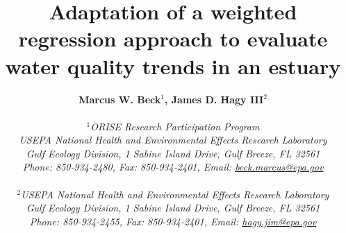 \documentclass[letterpaper,12pt,oneside]{article}\usepackage{graphicx, color}
\begin{document}
\raggedbottom
\linenumbers
\raggedright
{}
\setlength{\parindent}{0.5in}
\renewcommand\refname{References \vspace{12pt}}

\begin{singlespace}
\title{{\bf {\Large Adaptation of a weighted regression approach to evaluate water quality trends in an estuary}}}
\author{
  {\bf {\normalsize Marcus W. Beck$^1$, James D. Hagy III$^2$}}
	\\\\{\textit {\normalsize $^1$ORISE Research Participation Program}}
  \\{\textit {\normalsize USEPA National Health and Environmental Effects Research Laboratory}}
	\\{\textit {\normalsize Gulf Ecology Division, 1 Sabine Island Drive, Gulf Breeze, FL 32561}}
	\\{\textit {\normalsize Phone: 850-934-2480, Fax: 850-934-2401, Email: \href{mailto:beck.marcus@epa.gov}{beck.marcus@epa.gov}}}
	\\\\{\textit {\normalsize $^2$USEPA National Health and Environmental Effects Research Laboratory}}
	\\{\textit {\normalsize Gulf Ecology Division, 1 Sabine Island Drive, Gulf Breeze, FL 32561}}
	\\{\textit {\normalsize Phone: 850-934-2455, Fax: 850-934-2401, Email: \href{mailto:hagy.jim@epa.gov}{hagy.jim@epa.gov}}}
	}
\date{}
\maketitle
\end{singlespace}

\clearpage
\end{document}
